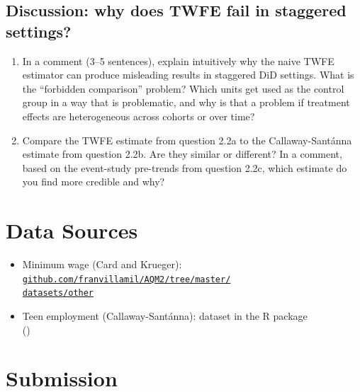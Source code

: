 \subsection{Discussion: why does TWFE fail in staggered settings?}

\begin{enumerate}[label=\alph*)]
  \item In a comment (3--5 sentences), explain intuitively why the naive TWFE estimator can produce misleading results in staggered DiD settings. What is the ``forbidden comparison'' problem? Which units get used as the control group in a way that is problematic, and why is that a problem if treatment effects are heterogeneous across cohorts or over time?
  \item Compare the TWFE estimate from question 2.2a to the Callaway-Sant\'{a}nna estimate from question 2.2b. Are they similar or different? In a comment, based on the event-study pre-trends from question 2.2c, which estimate do you find more credible and why?
\end{enumerate}

\vspace{15pt}

\clearpage
\section{Data Sources}

\begin{itemize}
  \item Minimum wage (Card and Krueger): \href{https://github.com/franvillamil/AQM2/tree/master/datasets/other}{\texttt{github.com/franvillamil/AQM2/tree/master/\\datasets/other}}
  \item Teen employment (Callaway-Sant\'{a}nna):  dataset in the  R package\\()
\end{itemize}

\vspace{15pt}

\section{Submission}

